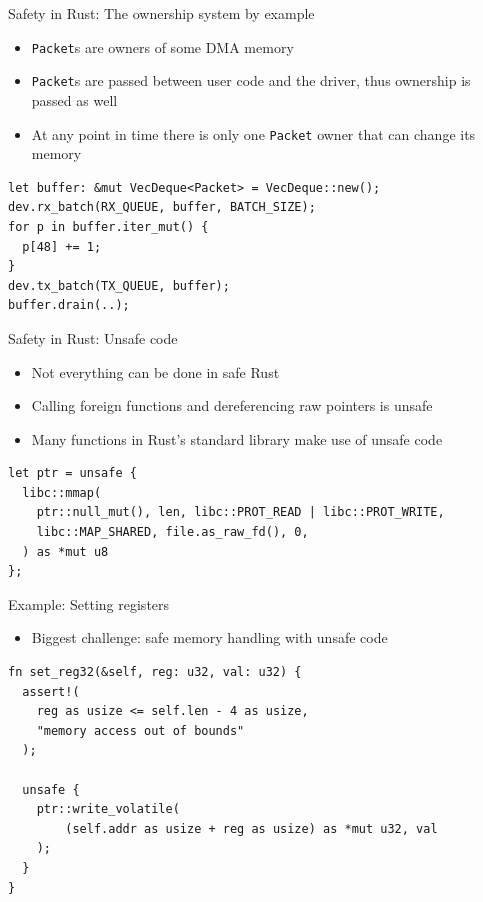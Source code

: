 \documentclass[NET,english,aspectratio=169,notitleframe]{tumbeamer}
\begin{document}
\begin{frame}[fragile]{Safety in Rust: The ownership system by example}
\begin{itemize}
\item \texttt{Packet}s are owners of some DMA memory
\item \texttt{Packet}s are passed between user code and the driver, thus ownership is passed as well
\item At any point in time there is only one \texttt{Packet} owner that can change its memory
\end{itemize}
\begin{verbatim}
let buffer: &mut VecDeque<Packet> = VecDeque::new();
dev.rx_batch(RX_QUEUE, buffer, BATCH_SIZE);
for p in buffer.iter_mut() {
  p[48] += 1;
}
dev.tx_batch(TX_QUEUE, buffer);
buffer.drain(..);
\end{verbatim}
\end{frame}

\begin{frame}[fragile]{Safety in Rust: Unsafe code}
\begin{itemize}
\item Not everything can be done in safe Rust
\item Calling foreign functions and dereferencing raw pointers is unsafe
\item Many functions in Rust's standard library make use of unsafe code
\end{itemize}
\begin{verbatim}
let ptr = unsafe {
  libc::mmap(
    ptr::null_mut(), len, libc::PROT_READ | libc::PROT_WRITE,
    libc::MAP_SHARED, file.as_raw_fd(), 0,
  ) as *mut u8
};
\end{verbatim}
\end{frame}

\begin{frame}[fragile]{Example: Setting registers}
\begin{itemize}
\item Biggest challenge: safe memory handling with unsafe code
\end{itemize}
\begin{verbatim}
fn set_reg32(&self, reg: u32, val: u32) {
  assert!(
    reg as usize <= self.len - 4 as usize,
    "memory access out of bounds"
  );

  unsafe {
    ptr::write_volatile(
        (self.addr as usize + reg as usize) as *mut u32, val
    );
  }
}
\end{verbatim}
\end{frame}
\end{document}
